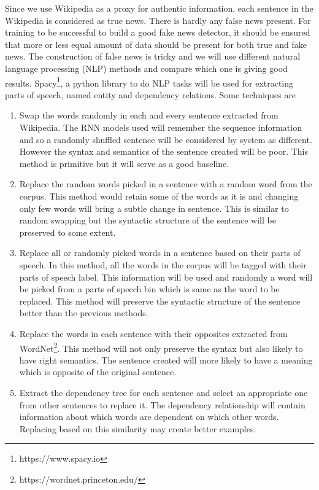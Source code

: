 \documentclass[a4paper, 11pt]{article}
\begin{document}
Since we use Wikipedia as a proxy for authentic information, each sentence in the Wikipedia is considered as true news. There is hardly any false news present. For training to be successful to build a good fake news detector, it should be ensured that more or less equal amount of data should be present for both true and fake news. The construction of false news is tricky and we will use different natural language processing (NLP) methods and compare which one is giving good results. Spacy\footnote{https://www.spacy.io}, a python library to do NLP tasks will be used for extracting parts of speech, named entity and dependency relations. Some techniques are 
\begin{enumerate}
\item Swap the words randomly in each and every sentence extracted from Wikipedia. The RNN models used will remember the sequence information and so a randomly shuffled sentence will be considered by system as different. However the syntax and semantics of the sentence created will be poor. This method is primitive but it will serve as a good baseline. 
\item Replace the random words picked in a sentence with a random word from the corpus. This method would retain some of the words as it is and changing only few words will bring a subtle change in sentence. This is similar to random swapping but the syntactic structure of the sentence will be preserved to some extent.
\item Replace all or randomly picked words in a sentence based on their parts of speech. In this method, all the words in the corpus will be tagged with their parts of speech label. This information will be used and randomly a word will be picked from a parts of speech bin which is same as the word to be replaced. This method will preserve the syntactic structure of the sentence better than the previous methods. 
\item Replace the words in each sentence with their opposites extracted from WordNet\footnote{https://wordnet.princeton.edu/}. This method will not only preserve the syntax but also likely to have right semantics. The sentence created will more likely to have a meaning which is opposite of the original sentence. 
\item Extract the dependency tree for each sentence and select an appropriate one from other sentences to replace it. The dependency relationship will contain information about which words are dependent on which other words. Replacing based on this similarity may create better examples.
\end{enumerate}
\end{document}
